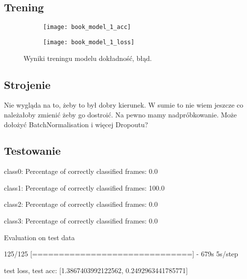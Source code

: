 \subsection{Trening}
\begin{figure}[h]
	\centering
	\begin{subfigure}{0.4\textwidth}
		\centering
		\texttt{[image: book\_model\_1\_acc]}
		\subcaption{\label{subfigure_a}}
	\end{subfigure}
	\begin{subfigure}{0.4\textwidth}
		\centering
		\texttt{[image: book\_model\_1\_loss]}
		\subcaption{\label{subfigure_b}}
	\end{subfigure}
	
	\caption{\label{fig:subcaption_example}Wyniki treningu modelu \protect{} dokładność, \protect{} błąd.}
\end{figure}
\subsection{Strojenie}
Nie wygląda na to, żeby to był dobry kierunek. W sumie to nie wiem jeszcze co należałoby zmienić żeby go dostroić. Na pewno mamy nadpróbkowanie. Może dołożyć BatchNormalisation i więcej Dropoutu?
\subsection{Testowanie}
class0:
Percentage of correctly classified frames: 0.0

class1:
Percentage of correctly classified frames: 100.0

class2:
Percentage of correctly classified frames: 0.0

class3:
Percentage of correctly classified frames: 0.0

Evaluation on test data

125/125 [==============================] - 679s 5s/step

test loss, test acc: [1.3867403992122562, 0.2492963441785771]

